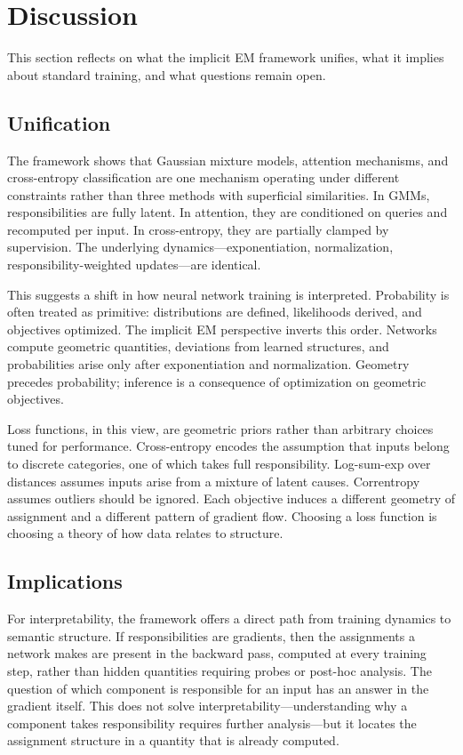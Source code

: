 \section{Discussion}

This section reflects on what the implicit EM framework unifies, what it implies about standard training, and what questions remain open.

\subsection{Unification}

The framework shows that Gaussian mixture models, attention mechanisms, and cross-entropy classification are one mechanism operating under different constraints rather than three methods with superficial similarities. In GMMs, responsibilities are fully latent. In attention, they are conditioned on queries and recomputed per input. In cross-entropy, they are partially clamped by supervision. The underlying dynamics---exponentiation, normalization, responsibility-weighted updates---are identical.

This suggests a shift in how neural network training is interpreted. Probability is often treated as primitive: distributions are defined, likelihoods derived, and objectives optimized. The implicit EM perspective inverts this order. Networks compute geometric quantities, deviations from learned structures, and probabilities arise only after exponentiation and normalization. Geometry precedes probability; inference is a consequence of optimization on geometric objectives.

Loss functions, in this view, are geometric priors rather than arbitrary choices tuned for performance. Cross-entropy encodes the assumption that inputs belong to discrete categories, one of which takes full responsibility. Log-sum-exp over distances assumes inputs arise from a mixture of latent causes. Correntropy assumes outliers should be ignored. Each objective induces a different geometry of assignment and a different pattern of gradient flow. Choosing a loss function is choosing a theory of how data relates to structure.

\subsection{Implications}

For interpretability, the framework offers a direct path from training dynamics to semantic structure. If responsibilities are gradients, then the assignments a network makes are present in the backward pass, computed at every training step, rather than hidden quantities requiring probes or post-hoc analysis. The question of which component is responsible for an input has an answer in the gradient itself. This does not solve interpretability---understanding why a component takes responsibility requires further analysis---but it locates the assignment structure in a quantity that is already computed.

